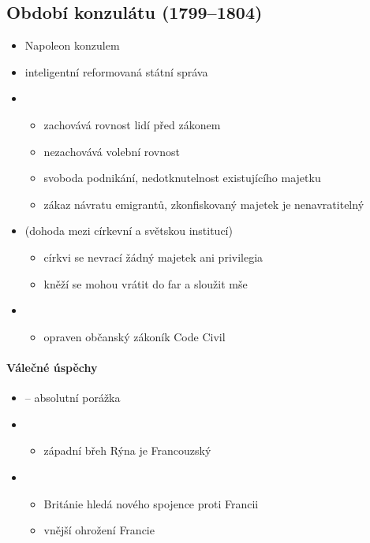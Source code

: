 \subsection{Období konzulátu (1799--1804)}
\begin{itemize}
\item Napoleon konzulem
\item inteligentní \ra reformovaná státní správa
\item {}
	\begin{itemize}
	\item zachovává rovnost lidí před zákonem
	\item nezachovává volební rovnost
	\item svoboda podnikání, nedotknutelnost existujícího majetku
	\item zákaz návratu emigrantů, zkonfiskovaný majetek je nenavratitelný
	\end{itemize}
\item {} (dohoda mezi církevní a světskou institucí)
	\begin{itemize}
	\item církvi se nevrací žádný majetek ani privilegia
	\item kněží se mohou vrátit do far a sloužit mše
	\end{itemize}
\item {}
	\begin{itemize}
	\item opraven občanský zákoník Code Civil
	\end{itemize}
\end{itemize}

\paragraph{Válečné úspěchy}
\begin{itemize}
\item {} -- absolutní porážka
\item {}
	\begin{itemize}
	\item západní břeh Rýna je Francouzský
	\end{itemize}
\item {}
	\begin{itemize}
	\item Británie hledá nového spojence proti Francii
	\item[\ra] vnější ohrožení Francie
	\end{itemize}
\end{itemize}

